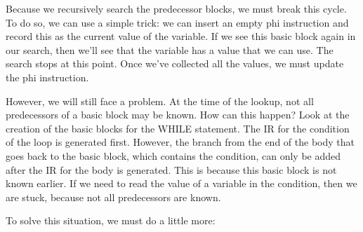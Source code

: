 Because we recursively search the predecessor blocks, we must break this cycle. To do so, we can use a simple trick: we can insert an empty phi instruction and record this as the current value of the variable. If we see this basic block again in our search, then we’ll see that the variable has a value that we can use. The search stops at this point. Once we’ve collected all the values, we must update the phi instruction.

However, we will still face a problem. At the time of the lookup, not all predecessors of a basic block may be known. How can this happen? Look at the creation of the basic blocks for the WHILE statement. The IR for the condition of the loop is generated first. However, the branch from the end of the body that goes back to the basic block, which contains the condition, can only be added after the IR for the body is generated. This is because this basic block is not known earlier. If we need to read the value of a variable in the condition, then we are stuck, because not all predecessors are known.

To solve this situation, we must do a little more:

